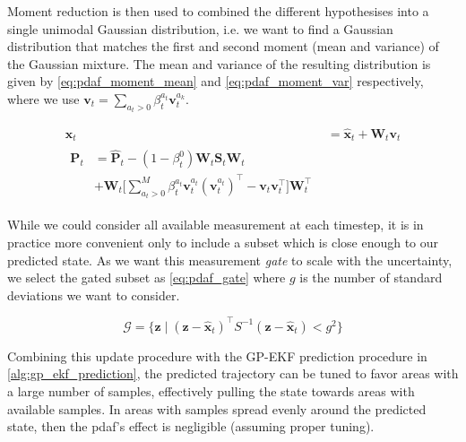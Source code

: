 Moment reduction is then used to combined the different hypothesises into a single unimodal Gaussian distribution, i.e. we want to find a Gaussian distribution that matches the first and second moment (mean and variance) of the Gaussian mixture. The mean and variance of the resulting distribution is given by \cref{eq:pdaf_moment_mean} and \cref{eq:pdaf_moment_var} respectively, where we use $\boldsymbol{v}_t = \sum_{a_t > 0} \beta_t^{a_t} \boldsymbol{v}_t^{a_k}$. 

\begin{subequations}
\begin{align}
    \boldsymbol{x}_t &= \hat{\boldsymbol{x}}_t + \boldsymbol{W}_t \boldsymbol{v}_t \label{eq:pdaf_moment_mean}\\
    \begin{split}
    \boldsymbol{P}_t &= \hat{\boldsymbol{P}}_t - (1 - \beta_t^{0}) \boldsymbol{W}_t \boldsymbol{S}_t  \boldsymbol{W}_t\\ &+ \boldsymbol{W}_t \big[\sum_{a_t > 0}^M \beta_t^{a_t} \boldsymbol{v}_t^{a_t} (\boldsymbol{v}_t^{a_t})^\intercal - \boldsymbol{v}_t \boldsymbol{v}_t^\intercal \big] \boldsymbol{W}_t^\intercal\label{eq:pdaf_moment_var}
    \end{split}
\end{align}
\end{subequations}

While we could consider all available measurement at each timestep, it is in practice more convenient only to include a subset which is close enough to our predicted state. As we want this measurement \textit{gate} to scale with the uncertainty, we select the gated subset as \cref{eq:pdaf_gate} where $g$ is the number of standard deviations we want to consider.

\begin{equation} \label{eq:pdaf_gate}
    \mathcal{G} = \big\{ \boldsymbol{z} \; | \; (\boldsymbol{z} - \hat{\boldsymbol{x}}_t)^\intercal S^{-1} (\boldsymbol{z} - \hat{\boldsymbol{x}}_t) < g^2 \big\}
\end{equation}




Combining this update procedure with the GP-EKF prediction procedure in \cref{alg:gp_ekf_prediction}, the predicted trajectory can be tuned to favor areas with a large number of samples, effectively pulling the state towards areas with available samples. In areas with samples spread evenly around the predicted state, then the \acrshort{pdaf}'s effect is negligible (assuming proper tuning).

